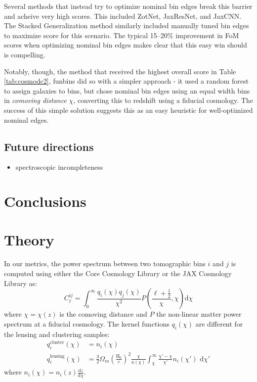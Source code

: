 \documentclass[twocolumn,twocolappendix]{aastex63}
\begin{document}
Several methods that instead try to optimize nominal bin edges break this
barrier and acheive very high scores.  This included ZotNet, JaxResNet, and JaxCNN.  The
Stacked Generalization method similarly included manually tuned bin edges to maximize
score for this scenario. The typical 15--20\% improvement in FoM scores when optimizing
nominal bin edges makes clear that this easy win should is compelling.

Notably, though, the method that received the highest overall score in Table \ref{tab:cosmodc2}, 
{\sc funbins} did so with a simpler approach - it used a random forest to assign galaxies to bins,
but chose nominal bin edges using an equal width bins in \emph{comoving distance} $\chi$, converting
this to redshift using a fiducial cosmology. The success of this simple solution suggests this
as an easy heuristic for well-optimized nominal edges.



\subsection{Future directions}

\begin{itemize}
    \item spectroscopic incompleteness
\end{itemize}

\section{Conclusions}




\appendix

\section{Theory}\label{app:theory}
In our metrics, the power spectrum between two tomographic bins $i$ and $j$ is computed using either the Core Cosmology Library \citep{ccl} or the JAX Cosmology Library \citep{jax-cosmo} as:
\begin{equation}
    C^{ij}_\ell = \int_0^{\infty} \frac{q_i(\chi) q_j(\chi)}{\chi^2} P\left(\frac{\ell +\frac{1}{2}}{\chi}, \chi \right) \mathrm{d}\chi
\end{equation}
where $\chi = \chi(z)$ is the comoving distance and $P$ the non-linear matter power spectrum at
a fiducial cosmology.  The kernel functions $q_i(\chi)$ are different for the lensing and clustering samples:
\begin{align}
    q^{\mathrm{cluster}}_i(\chi) &= n_i(\chi)\\
    q^{\mathrm{lensing}}_i(\chi) &= \frac{3}{2}\Omega_m \left(\frac{\mathrm{H}_0}{c}\right)^2 \frac{\chi}{a(\chi)} \int_\chi^{\infty} \frac{\chi' - \chi}{\chi'} n_i(\chi')\,\,\mathrm{d}\chi'
\end{align}
where $n_i(\chi) = n_i(z) \frac{\mathrm{d}z}{\mathrm{d}\chi}$.
\end{document}
